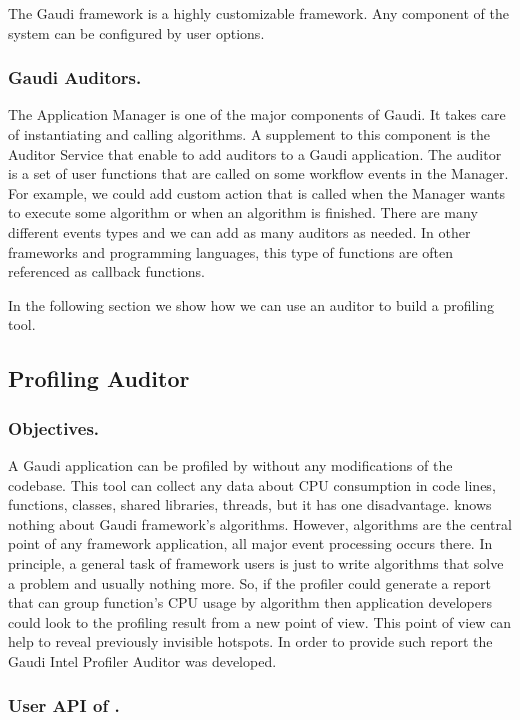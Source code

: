 \documentclass[a4paper]{jpconf}
\begin{document}
The Gaudi framework is a highly customizable framework. Any component of the system can be configured by user options. 

\subsubsection{Gaudi Auditors.}

The Application Manager is one of the major components of Gaudi. It takes care of instantiating and
 calling algorithms. A supplement to this component  is the Auditor Service that enable to add auditors to a
 Gaudi application. The auditor is a set of user functions that are called on some workflow events in the Manager. 
 For example, we could add custom action that is called when the Manager wants to execute some algorithm or when 
 an algorithm is finished.  There are many different events types and we can add as many auditors as needed. 
 In other frameworks and programming languages, this type of functions are often referenced as callback functions.

In the following section we show how we can use an auditor to build a profiling tool.

\subsection{Profiling Auditor}

\subsubsection{Objectives.}

A Gaudi application can be profiled by \amp  without any modifications of the codebase.  This tool can collect any data 
about CPU consumption in code lines, functions, classes, shared libraries, threads, but it has one disadvantage. 
\amp knows nothing about Gaudi framework's algorithms. However, algorithms are the central point of any framework 
application, all major event processing occurs there. In principle, a general task of framework users is just to write 
algorithms that solve a problem and usually nothing more. So, if the profiler could generate a report that can group 
function’s CPU usage by algorithm then application developers could look to the profiling result 
from a new point of view. This point of view can help to reveal previously invisible hotspots. 
In order to provide such report the Gaudi Intel Profiler Auditor was developed.

\subsubsection{User API of \iamp.}
\end{document}
